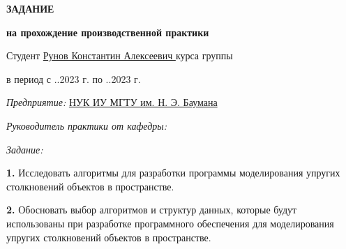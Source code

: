 \begin{center}\linespread{1}\selectfont
    \Large{\textbf{ЗАДАНИЕ}}

    \large{\textbf{на прохождение производственной практики}}

    \large{}
\end{center}

\fontsize{14pt}{14pt}\selectfont

\noindent Студент \uline{\hfill Рунов Константин Алексеевич \hfill}  курса группы 

\vspace{0.3cm}

\noindent в период с ..2023 г. по ..2023 г.

\vspace{0.3cm}

\noindent \textit{Предприятие:} \uline{\hfill НУК ИУ МГТУ им. Н. Э. Баумана \hfill}

\vspace{0.3cm}






\noindent \textit{Руководитель практики от кафедры:}

\noindent {}

\vspace{0.3cm}

\noindent \textit{Задание:}

\noindent \textbf{1.} Исследовать алгоритмы для разработки программы моделирования упругих столкновений объектов в пространстве.

\noindent \textbf{2.} Обосновать выбор алгоритмов и структур данных, которые будут использованы при разработке программного обеспечения для моделирования упругих столкновений объектов в пространстве.

